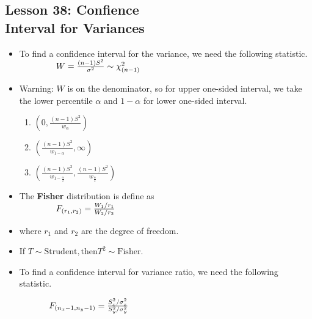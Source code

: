 \documentclass[10pt, french]{article}
\begin{document}
\begin{multicols*}{3}
\section*{Lesson 38: Confience \\ Interval for Variances}
\begin{itemize}[align=left,leftmargin=*]
  \item To find a confidence interval for the variance, we need the following statistic. \\
  $\hspace*{1.5cm} W = \frac{(n-1)S^2}{\sigma^2}\sim\chi_{(n-1)}^2$
  \item Warning: $W$ is on the denominator, so for upper one-sided interval, we take the lower percentile $\alpha$ and $1-\alpha$ for lower one-sided interval.
  \begin{enumerate}
      \item $\left(0, \frac{(n-1)S^2}{w_{\alpha}} \right)$
      \item $\left(\frac{(n-1)S^2}{w_{1-\alpha}}, \infty \right)$
      \item  $\left(\frac{(n-1)S^2}{w_{1-\frac{\alpha}{2}}}, \frac{(n-1)S^2}{w_{\frac{\alpha}{2}}} \right)$
  \end{enumerate}
  \item The \textbf{Fisher} distribution is define as \\
  $\hspace*{1.5cm} F_{(r_1,r_2)} = \frac{W_1/r_1}{W_2/r_2}$
  \item[] where $r_1$ and $r_2$ are the degree of freedom.
  \item If $T\sim \mathrm{Strudent}, \text{then} T^2\sim \mathrm{Fisher}$.
  \item
  \begin{flushleft}
    To find a confidence interval for variance ratio, we need the following statistic.
  \end{flushleft}
  $\hspace*{1.2cm} F_{(n_x - 1,n_y - 1)} = \frac{S_x^2/\sigma_x^2}{S_y^2/\sigma_y^2}$
\end{itemize}


\end{multicols*}
\end{document}
